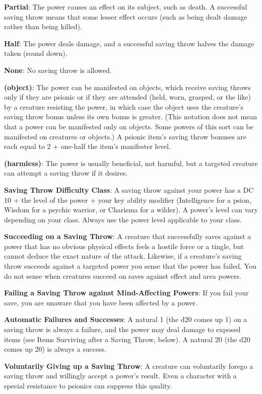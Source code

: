 \textbf{Partial}: The power causes an effect on its subject, such as death. A successful saving throw means that some lesser effect occurs (such as being dealt damage rather than being killed).

\textbf{Half}: The power deals damage, and a successful saving throw halves the damage taken (round down).

\textbf{None}: No saving throw is allowed.

\textbf{(object)}: The power can be manifested on objects, which receive saving throws only if they are psionic or if they are attended (held, worn, grasped, or the like) by a creature resisting the power, in which case the object uses the creature's saving throw bonus unless its own bonus is greater. (This notation does not mean that a power can be manifested only on objects. Some powers of this sort can be manifested on creatures or objects.) A psionic item's saving throw bonuses are each equal to 2 + one-half the item's manifester level.

\textbf{(harmless)}: The power is usually beneficial, not harmful, but a targeted creature can attempt a saving throw if it desires.

\textbf{Saving Throw Difficulty Class}: A saving throw against your power has a DC 10 + the level of the power + your key ability modifier (Intelligence for a psion, Wisdom for a psychic warrior, or Charisma for a wilder). A power's level can vary depending on your class. Always use the power level applicable to your class.

\textbf{Succeeding on a Saving Throw}: A creature that successfully saves against a power that has no obvious physical effects feels a hostile force or a tingle, but cannot deduce the exact nature of the attack. Likewise, if a creature's saving throw succeeds against a targeted power you sense that the power has failed. You do not sense when creatures succeed on saves against effect and area powers.

\textbf{Failing a Saving Throw against Mind-Affecting Powers}: If you fail your save, you are unaware that you have been affected by a power.

\textbf{Automatic Failures and Successes}: A natural 1 (the d20 comes up 1) on a saving throw is always a failure, and the power may deal damage to exposed items (see Items Surviving after a Saving Throw, below). A natural 20 (the d20 comes up 20) is always a success.

\textbf{Voluntarily Giving up a Saving Throw}: A creature can voluntarily forego a saving throw and willingly accept a power's result. Even a character with a special resistance to psionics can suppress this quality.

